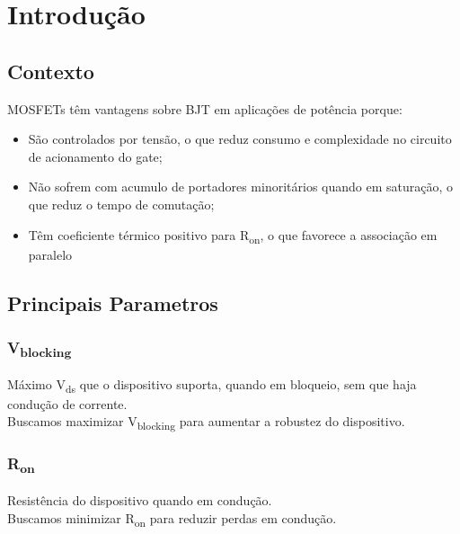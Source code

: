 \section{Introdução}

\subsection{Contexto}

\begin{frame}

    MOSFETs têm vantagens sobre BJT em aplicações de potência porque:
    \begin{itemize}
        \item São controlados por tensão, o que reduz consumo e complexidade no circuito de acionamento do gate;
        \item Não sofrem com acumulo de portadores minoritários quando em saturação, o que reduz o tempo de comutação;
        \item Têm coeficiente térmico positivo para R\textsubscript{on}, o que favorece a associação em paralelo
    \end{itemize}

\end{frame}

\subsection{Principais Parametros}

\begin{frame}
    
    \frametitle{V\textsubscript{blocking}}

    Máximo V\textsubscript{ds} que o dispositivo suporta, quando em bloqueio, sem que haja condução de corrente. \\
    Buscamos maximizar V\textsubscript{blocking} para aumentar a robustez do dispositivo.

\end{frame}

\begin{frame}
    
    \frametitle{R\textsubscript{on}}

    Resistência do dispositivo quando em condução. \\
    Buscamos minimizar R\textsubscript{on} para reduzir perdas em condução.

\end{frame}

